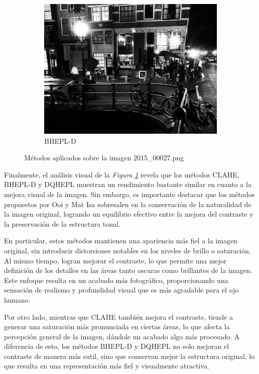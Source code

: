 \documentclass[sigchi]{acmart}
\begin{document}
\begin{figure}[htbp]
	\begin{subfigure}[b]{0.28\textwidth}
		\centering
		\includegraphics[width=\linewidth]{./procesadas/2015_00027/2015_00027_bhepl_d.png}
		\caption{BHEPL-D}
	\end{subfigure}

	\caption{Métodos aplicados sobre la imagen 2015\_00027.png}
	\label{fig:visual_027}
\end{figure}

Finalmente, el análisis visual de la \emph{Figura \ref{fig:visual_027}} revela que los métodos CLAHE,
BHEPL-D y DQHEPL muestran un rendimiento bastante similar en cuanto a la mejora visual de la
imagen. Sin embargo, es importante destacar que los métodos propuestos por Ooi y Mat Isa
sobresalen en la conservación de la naturalidad de la imagen original, logrando un equilibrio
efectivo entre la mejora del contraste y la preservación de la estructura tonal.

En particular, estos métodos mantienen una apariencia más fiel a la imagen original, sin
introducir distorsiones notables en los niveles de brillo o saturación. Al mismo tiempo, logran
mejorar el contraste, lo que permite una mejor definición de los detalles en las áreas tanto
oscuras como brillantes de la imagen. Este enfoque resulta en un acabado más fotográfico,
proporcionando una sensación de realismo y profundidad visual que es más agradable para el ojo
humano.

Por otro lado, mientras que CLAHE también mejora el contraste, tiende a generar una saturación
más pronunciada en ciertas áreas, lo que afecta la percepción general de la imagen, dándole un
acabado algo más procesado. A diferencia de esto, los métodos BHEPL-D y DQHEPL no solo mejoran
el contraste de manera más sutil, sino que conservan mejor la estructura original, lo que
resulta en una representación más fiel y visualmente atractiva.
\end{document}
